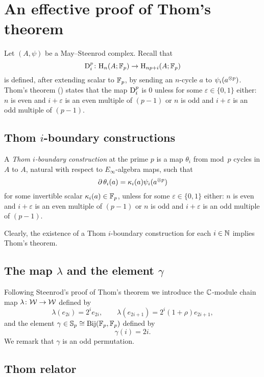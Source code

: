 
\appendix
\section{An effective proof of Thom's theorem}\label{s:thom}


Let $(A,\psi)$ be a May--Steenrod complex.
Recall that
\[
\mathrm{D}_i^p \colon \mathrm{H}_n(A; {\mathbb{F}_p}) \to \mathrm{H}_{np+i}(A; {\mathbb{F}_p})
\]
is defined, after extending scalar to ${\mathbb{F}_p}$, by sending an $n$-cycle $a$ to $\psi_i(a^{\otimes p})$.
Thom's theorem (\cite[218]{steenrod1953cyclic}) states that the map $\mathrm{D}_i^p$ is $0$ unless for some $\varepsilon \in \{0,1\}$ either: $n$ is even and $i+\varepsilon$ is an even multiple of $(p-1)$ or $n$ is odd and $i+\varepsilon$ is an odd multiple of $(p-1)$.

\subsection{Thom $i$-boundary constructions}

A \textit{Thom $i$-boundary construction} at the prime $p$ is a map $\theta_i$ from mod~$p$ cycles in $A$ to $A$, natural with respect to $E_\infty$-algebra maps, such that
\[
\operatorname{\partial} \theta_i(a) = \kappa_i(a) \psi_i(a^{\otimes p})
\]
for some invertible scalar $\kappa_i(a) \in {\mathbb{F}_p}$, unless for some $\varepsilon \in \{0,1\}$ either: $n$ is even and $i+\varepsilon$ is an even multiple of $(p-1)$ or $n$ is odd and $i+\varepsilon$ is an odd multiple of $(p-1)$.

Clearly, the existence of a Thom $i$-boundary construction for each $i \in \mathbb{N}$ implies Thom's theorem.

\subsection{The map $\lambda$ and the element $\gamma$}

Following Steenrod's proof of Thom's theorem we introduce the $\mathbb{C}$-module chain map $\lambda \colon \mathcal{W} \to \mathcal{W}$ defined by
\[
\lambda(e_{2i}) = 2^i e_{2i}, \qquad
\lambda(e_{2i+1}) = 2^i (1 + \rho) e_{2i+1},
\]
and the element $\gamma \in \mathbb{S}_p \cong \mathrm{Bij}({\mathbb{F}_p}, {\mathbb{F}_p})$ defined by
\[
\gamma(i) = 2i.
\]
We remark that $\gamma$ is an odd permutation.

\subsection{Thom relator}

